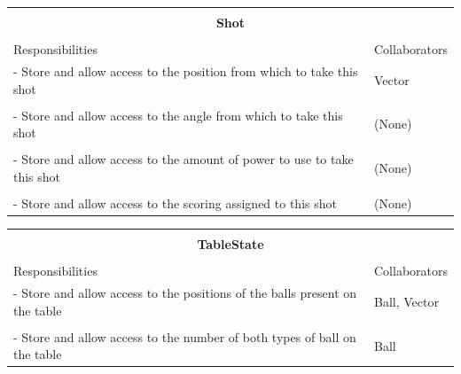\documentclass[titlepage]{article}
\begin{document}
\begin{table}[!htbp]
\centering
\begin{tabular}{| p{} | p{} |}\hline
	\multicolumn{2}{|l|}{}\\
	\multicolumn{2}{|c|}{\large{\textbf{Shot}}}\\
	\multicolumn{2}{|l|}{}\\\hline
	\vspace{0mm}\large{Responsibilities}\vspace{2mm} &\vspace{0mm}\large{Collaborators}\vspace{2mm}\\\hline
	\vspace{0mm}- Store and allow access to the position from which to take this shot	&\vspace{0mm}Vector\\&\\
	- Store and allow access to the angle from which to take this shot					&(None)\\&\\
	- Store and allow access to the amount of power to use to take this shot			&(None)\\&\\
	- Store and allow access to the scoring assigned to this shot\vspace{2mm}			&(None)\vspace{2mm}\\\hline
\end{tabular}
\end{table}

\begin{table}[!htbp]
\centering
\begin{tabular}{| p{} | p{} |}\hline
	\multicolumn{2}{|l|}{}\\
	\multicolumn{2}{|c|}{\large{\textbf{TableState}}}\\
	\multicolumn{2}{|l|}{}\\\hline
	\vspace{0mm}\large{Responsibilities}\vspace{2mm} &\vspace{0mm}\large{Collaborators}\vspace{2mm}\\\hline
	\vspace{0mm}- Store and allow access to the positions of the balls present on the table		&\vspace{0mm}Ball, Vector\\&\\
	- Store and allow access to the number of both types of ball on the table\vspace{2mm}		&Ball\vspace{2mm}\\\hline
\end{tabular}
\end{table}
\newpage
\end{document}
